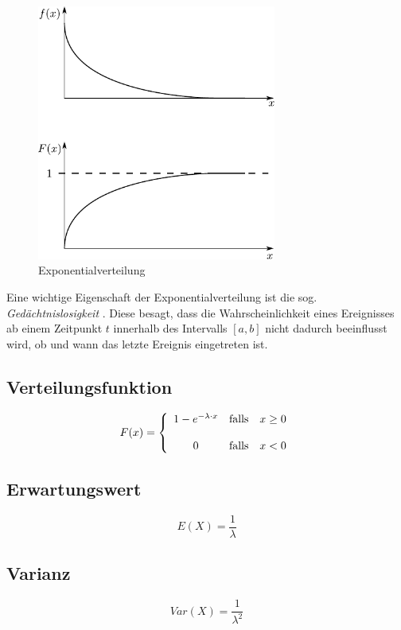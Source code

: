 \begin{figure}[h!]
	\centering
	\includegraphics[width=0.7\textwidth]{exponential.pdf}
	\caption{Exponentialverteilung}
	\label{fig:exponential}
\end{figure}

Eine wichtige Eigenschaft der Exponentialverteilung ist die sog. 
\emph{Gedächtnislosigkeit} \parencite[296]{henze}. Diese besagt, dass die 
Wahrscheinlichkeit eines Ereignisses ab einem Zeitpunkt $t$ innerhalb des 
Intervalls $[a,b]$ nicht dadurch beeinflusst wird, ob und wann das letzte
Ereignis eingetreten ist.

\subsection{Verteilungsfunktion}
\[ 
	F(x) = \left\{ 
	\begin{array}{c c l}
		1-e^{-\lambda \cdot x}
			& \text{falls}
			& x \geq 0 \\
		& & \\
		0
			& \text{falls}
			& x < 0
	\end{array}
	\right.
\]

\subsection{Erwartungswert}
\[ 
	E(X) = \frac{1}{\lambda}
\]

\subsection{Varianz}
\[  
	Var(X) = \frac{1}{\lambda^2}
\]

